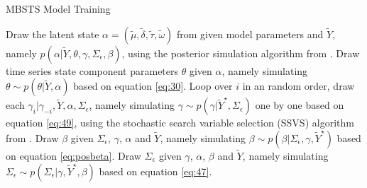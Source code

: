 \documentclass[twoside,11pt]{article}
\begin{document}
\begin{algorithm}
	\caption{MBSTS Model Training}
	\label{algo:slide_generator}
	\begin{algorithmic}[1]
		\State Draw the latent state $\alpha=(\tilde{\mu},\tilde{\delta},\tilde{\tau},\tilde{\omega})$ from given model parameters and $\tilde{Y}$, namely $p(\alpha|\tilde{Y},\theta,\gamma,\Sigma_\epsilon,\beta)$, using the posterior simulation algorithm from \cite{durbin2002simple}.
		\State Draw time series state component parameters $\theta$ given $\alpha$, namely simulating
		$\theta \sim p(\theta|\tilde{Y},\alpha)$ based on equation \eqref{eq:30}.
		\State Loop over $i$ in an random order, draw each  $\gamma_i|\gamma_{-i},\tilde{Y},\alpha,\Sigma_\epsilon$, namely simulating $\gamma \sim p(\gamma|\tilde{Y}^\star,\Sigma_\epsilon)$  one by one based on equation \eqref{eq:49}, using the stochastic search variable selection (SSVS) algorithm from \cite{george1997approaches}.
    \State Draw $\beta$ given $\Sigma_\epsilon$, $\gamma$, $\alpha$ and $\tilde{Y}$, namely simulating $ \beta \sim p(\beta|\Sigma_\epsilon,\gamma, \tilde{Y}^\star)$  based on equation \eqref{eq:posbeta}.		
\State Draw $\Sigma_\epsilon$ given $\gamma$, $\alpha$, $\beta$ and $\tilde{Y}$, namely simulating $\Sigma_\epsilon \sim p(\Sigma_\epsilon|\gamma,\tilde{Y}^\star,\beta)$  based on equation \eqref{eq:47}.
		
	\end{algorithmic}
\end{algorithm}

%
\end{document}
